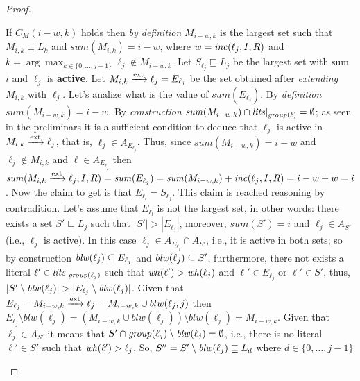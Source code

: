 \begin{proof}
\begin{itemize}
\begin{itemize}
            If $C_M(i-w,k)$ holds then \textit{by definition} $M_{i-w,k}$ is the largest set 
            such that $M_{i,k} \sqsubseteq L_{k}$ and $\mathit{sum}(M_{i,k}) = i-w$, where 
            $w = \mathit{inc}(\ell_j,I,R)$ and $k = \arg \max_{k \in \{0,\hdots,j-1\}} \ell_j \not\in M_{i-w,k}$.
            Let $S_{\ell_j} \sqsubseteq L_j$ be the largest set with sum $i$
            and $\ell_j$ is \textbf{active}.
            Let $M_{i,k} \xrightarrow{\text{ext}} \ell_j = E_{\ell_j}$ be the set obtained after \textit{extending} 
            $M_{i,k}$ with $\ell_j$.
            Let's analize what is the value of $\mathit{sum}(E_{\ell_j})$.
            By \textit{definition} $\mathit{sum}(M_{i-w,k}) = i-w$.
            By \textit{construction}  $\mathit{sum}(M_{i-w,k}) \cap \mathit{lits}|_{\mathit{group}(\ell)} = \emptyset$;
            as seen in the preliminars it is a sufficient condition to deduce that $\ell_j$ is active 
            in $M_{i,k} \xrightarrow{\text{ext}} \ell_j$, that is, $\ell_j \in A_{E_{\ell_j}}$.
            Thus, since $\mathit{sum}(M_{i-w,k}) = i-w$ and $\ell_j \not\in M_{i,k}$ and $ \ell \in A_{E_{\ell_j}}$ then 
            $\mathit{sum}(M_{i,k} \xrightarrow{\text{ext}} \ell_j,I,R) = \mathit{sum}(E_{\ell_j}) = \mathit{sum}(M_{i-w,k}) + \mathit{inc}(\ell_j,I,R) = i - w + w = i$.
            Now the claim to get is that $E_{\ell_l} = S_{\ell_j}$.
            This claim is reached reasoning by contradition.
            Let's assume that $E_{\ell_l}$ is not the largest set, in other words: 
            there exists a set $S' \sqsubseteq L_j$ such that $|S'| > |E_{\ell_j}|$, moreover,
            $\mathit{sum}(S') = i$ and $\ell_j \in A_{S'}$ (i.e., $\ell_j$ is active).
            In this case $\ell_j \in A_{E_{\ell_j}} \cap A_{S'}$, i.e., it is active in both sets;
            so by construction $\mathit{blw}(\ell_j) \subseteq E_{\ell_j}$ and $\mathit{blw}(\ell_j) \subseteq S'$, furthermore,
            there not exists a literal $\ell' \in \mathit{lits}|_{\mathit{group}(\ell_j)}$ such that $\mathit{wh}(\ell') > \mathit{wh}(\ell_j)$
            and $\ell' \in E_{\ell_j}$ or $\ell' \in S'$, thus,
            $|S' \setminus \mathit{blw}(\ell_j)| > |E_{\ell_j} \setminus \mathit{blw}(\ell_j)|$.
            Given that $E_{\ell_j} = M_{i-w,k} \xrightarrow{\text{ext}} \ell_j = M_{i-w,k} \cup blw(\ell_j,j)$ then
            $E_{\ell_j} \setminus blw(\ell_j) = (M_{i-w,k} \cup blw(\ell_j)) \setminus blw(\ell_j) = M_{i-w,k}.$
            Given that $\ell_j \in A_{S'}$ it means that $S' \cap \mathit{group}(\ell_j) \setminus \mathit{blw}(\ell_j) = \emptyset$, i.e.,
            there is no literal $\ell' \in S'$ such that $\mathit{wh}(\ell') > \ell_j$.
            So, $S'' = S' \setminus \mathit{blw}(\ell_j) \sqsubseteq L_d$ where $d \in \{0,\hdots,j-1\}$

\end{itemize}
\end{itemize}
\end{proof}
